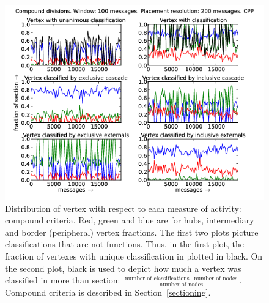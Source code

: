 \documentclass[%
 aip,
 jmp,%
 amsmath,amssymb,
 reprint,%
]{revtex4-1}
\begin{document}
\begin{figure}[hbtp] 
   \centering
        \includegraphics[width=\textwidth]{figs/CPP/100_2}
    \caption{Distribution of vertex with respect to each measure of activity: compound criteria. Red, green and blue are for hubs, intermediary and border (peripheral) vertex fractions. The first two plots picture classifications that are not functions. Thus, in the first plot, the fraction of vertexes with unique classification in plotted in black. On the second plot, black is used to depict how much a vertex was classified in more than section: $\frac{\text{number of classifications} - \text{number of nodes}}{\text{number of nodes}}$. Compound criteria is described in Section~\ref{sectioning}.}
    \label{fig:cpp100_}
\end{figure}
\end{document}
